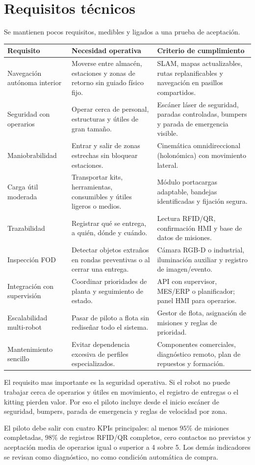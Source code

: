 \chapter{Requisitos técnicos}

Se mantienen pocos requisitos, medibles y ligados a una prueba de aceptación.

\begin{longtable}{P{0.24\textwidth}P{0.34\textwidth}P{0.32\textwidth}}
\toprule
Requisito & Necesidad operativa & Criterio de cumplimiento\\
\midrule
\endhead
Navegación autónoma interior & Moverse entre almacén, estaciones y zonas de retorno sin guiado físico fijo. & SLAM, mapas actualizables, rutas replanificables y navegación en pasillos compartidos.\\
Seguridad con operarios & Operar cerca de personal, estructuras y útiles de gran tamaño. & Escáner láser de seguridad, paradas controladas, bumpers y parada de emergencia visible.\\
Maniobrabilidad & Entrar y salir de zonas estrechas sin bloquear estaciones. & Cinemática omnidireccional (holonómica) con movimiento lateral.\\
Carga útil moderada & Transportar kits, herramientas, consumibles y útiles ligeros o medios. & Módulo portacargas adaptable, bandejas identificadas y fijación segura.\\
Trazabilidad & Registrar qué se entrega, a quién, dónde y cuándo. & Lectura RFID/QR, confirmación HMI y base de datos de misiones.\\
Inspección FOD & Detectar objetos extraños en rondas preventivas o al cerrar una entrega. & Cámara RGB-D o industrial, iluminación auxiliar y registro de imagen/evento.\\
Integración con supervisión & Coordinar prioridades de planta y seguimiento de estado. & API con supervisor, MES/ERP o planificador; panel HMI para operarios.\\
Escalabilidad multi-robot & Pasar de piloto a flota sin rediseñar todo el sistema. & Gestor de flota, asignación de misiones y reglas de prioridad.\\
Mantenimiento sencillo & Evitar dependencia excesiva de perfiles especializados. & Componentes comerciales, diagnóstico remoto, plan de repuestos y formación.\\
\bottomrule
\end{longtable}

\begin{decisionbox}
El requisito mas importante es la seguridad operativa. Si el robot no puede trabajar cerca de operarios y útiles en movimiento, el registro de entregas o el kitting pierden valor. Por eso el piloto incluye desde el inicio escáner de seguridad, bumpers, parada de emergencia y reglas de velocidad por zona.
\end{decisionbox}

El piloto debe salir con cuatro KPIs principales: al menos \(95\%\) de misiones completadas, \(98\%\) de registros RFID/QR completos, cero contactos no previstos y aceptación media de operarios igual o superior a 4 sobre 5. Los demás indicadores se revisan como diagnóstico, no como condición automática de compra.

